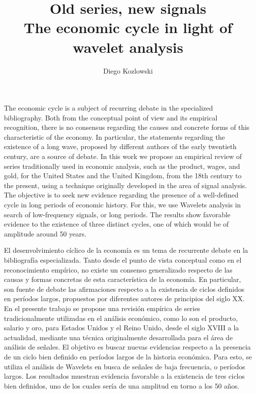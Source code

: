 \documentclass[a4paper]{article}
\title{Old series, new signals \\
	 {\large The economic cycle in light of wavelet analysis} }
\author[1]{Diego Kozlowski}
\affil[1]{Master in Data Mining \& Knowledge Discovery, FCEN-UBA\\ diegokoz92@gmail.com}
\date{}                     %
\renewenvironment{abstract}{
	\vspace*{\fill}
	\begin{center}%
		\bfseries\abstractname
\end{center}}%
{\vfill}
\begin{document}
	
	
	\maketitle
	
	
	\begin{abstract}
		The economic cycle is a subject of recurring debate in the specialized bibliography. Both from the conceptual point of view and its empirical recognition, there is no consensus regarding the causes and concrete forms of this characteristic of the economy. In particular, the statements regarding the existence of a long wave, proposed by different authors of the early twentieth century, are a source of debate. In this work we propose an empirical review of series traditionally used in economic analysis, such as the product, wages, and gold, for the United States and the United Kingdom, from the 18th century to the present, using a technique originally developed in the area of ​​signal analysis. The objective is to seek new evidence regarding the presence of a well-defined cycle in long periods of economic history. For this, we use Wavelets analysis in search of low-frequency signals, or long periods. The results show favorable evidence to the existence of three distinct cycles, one of which would be of amplitude around 50 years.
	\end{abstract}
	
	\begin{abstract}
		El desenvolvimiento cíclico de la economía es un tema de recurrente debate en la bibliografía especializada. Tanto desde el punto de vista conceptual como en el reconocimiento empírico, no existe un consenso generalizado respecto de las causas y formas concretas de esta característica de la economía. En particular, son fuente de debate las afirmaciones respecto a la existencia de ciclos definidos en períodos largos, propuestos por diferentes autores de principios del siglo XX. En el presente trabajo se propone una revisión empírica de series tradicionalmente utilizadas en el análisis económico, como lo son el producto, salario y oro, para Estados Unidos y el Reino Unido, desde el siglo XVIII a la actualidad, mediante una técnica originalmente desarrollada para el área de análisis de señales. El objetivo es buscar nuevas evidencias respecto a la presencia de un ciclo bien definido en períodos largos de la historia económica. Para esto, se utiliza el análisis de Wavelets en busca de señales de baja frecuencia, o períodos largos. Los resultados muestran evidencia favorable a la existencia de tres ciclos bien definidos, uno de los cuales sería de una amplitud en torno a los 50 años.
	\end{abstract}
	
\end{document}
